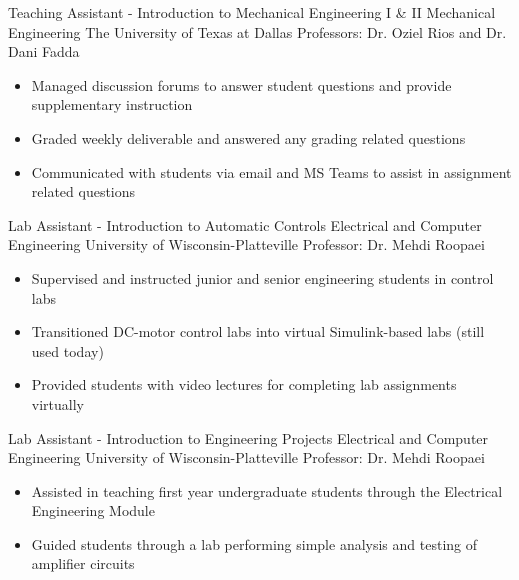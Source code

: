 \documentclass[11pt,letterpaper,roman]{moderncv} %
\begin{document}

{Teaching Assistant - Introduction to Mechanical Engineering I \& II}
{Mechanical Engineering}
{The University of Texas at Dallas}
{Professors: Dr. Oziel Rios and Dr. Dani Fadda}
{\begin{itemize}
    \item Managed discussion forums to answer student questions and provide supplementary instruction
    \item Graded weekly deliverable and answered any grading related questions
    \item Communicated with students via email and MS Teams to assist in assignment related questions
\end{itemize}
}

{Lab Assistant - Introduction to Automatic Controls}
{Electrical and Computer Engineering}
{University of Wisconsin-Platteville}
{Professor: Dr. Mehdi Roopaei}
{\begin{itemize}
    \item Supervised and instructed junior and senior engineering students in control labs
    \item Transitioned DC-motor control labs into virtual Simulink-based labs (still used today)
    \item Provided students with video lectures for completing lab assignments virtually
\end{itemize}
}

{Lab Assistant - Introduction to Engineering Projects}
{Electrical and Computer Engineering}
{University of Wisconsin-Platteville}
{Professor: Dr. Mehdi Roopaei}
{\begin{itemize}
    \item Assisted in teaching first year undergraduate students through the Electrical Engineering Module
    \item Guided students through a lab performing simple analysis and testing of amplifier circuits
\end{itemize}
}
\end{document}
